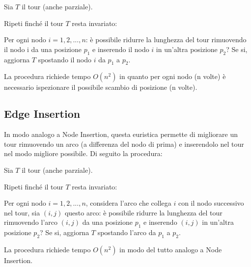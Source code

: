 \documentclass[a4paper,12pt]{report}
\begin{document}
\begin{tcolorbox}[colframe=black,colback=white,boxrule=0.5pt, sharp corners]
\begin{legal}
  \item Sia $T$ il tour (anche parziale).
  \item Ripeti finché il tour $T$ resta invariato:
  \begin{legal}
    \item Per ogni nodo $i = 1, 2, ..., n$: è possibile ridurre la lunghezza del tour rimuovendo il nodo i da una posizione $p_1$ e inserendo il nodo $i$ in un'altra posizione $p_2$? Se si, aggiorna $T$ spostando il nodo $i$ da $p_1$ a $p_2$.
  \end{legal}
\end{legal}
\end{tcolorbox}
\hfill \break
La procedura richiede tempo $O(n^2)$ in quanto per ogni nodo (n volte) è necessario ispezionare il possibile scambio di posizione (n volte).

\subsection{Edge Insertion}
In modo analogo a Node Insertion, questa euristica permette di migliorare un tour rimuovendo un arco (a differenza del nodo di prima) e inserendolo nel tour nel modo migliore possibile. Di seguito la procedura:

\begin{tcolorbox}[colframe=black,colback=white,boxrule=0.5pt, sharp corners]
\begin{legal}
  \item Sia $T$ il tour (anche parziale).
  \item Ripeti finché il tour $T$ resta invariato:
  \begin{legal}
    \item Per ogni nodo $i = 1, 2, ..., n$, considera l'arco che collega $i$ con il nodo successivo nel tour, sia $(i, j)$ questo arco: è possibile ridurre la lunghezza del tour rimuovendo l'arco $(i, j)$ da una posizione $p_1$ e inserendo $(i, j)$ in un'altra posizione $p_2$? Se si, aggiorna $T$ spostando l'arco da $p_1$ a $p_2$.
  \end{legal}
\end{legal}
\end{tcolorbox}
\hfill \break
La procedura richiede tempo $O(n^2)$ in modo del tutto analogo a Node Insertion.
\end{document}
